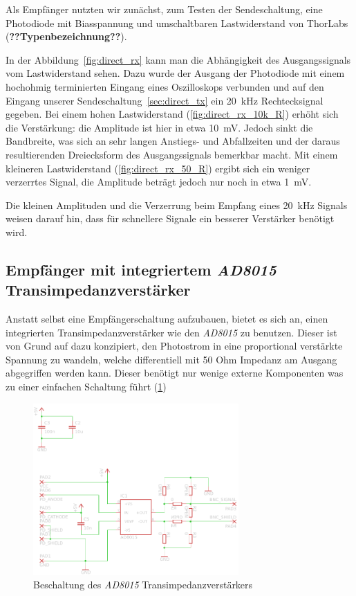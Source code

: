 \documentclass[12pt,a4paper]{article}
\begin{document}
Als Empfänger nutzten wir zunächst, zum Testen der Sendeschaltung, eine Photodiode mit Biasspannung und umschaltbaren Lastwiderstand von ThorLabs (\textbf{??Typenbezeichnung??}).

In der Abbildung~\ref{fig:direct_rx} kann man die Abhängigkeit des Ausgangssignals vom Lastwiderstand sehen. Dazu wurde der Ausgang der Photodiode mit einem hochohmig terminierten Eingang eines Oszilloskops verbunden und auf den Eingang unserer Sendeschaltung~\ref{sec:direct_tx} ein \SI{20}{\kilo\hertz} Rechtecksignal gegeben. Bei einem hohen Lastwiderstand (\ref{fig:direct_rx_10k_R}) erhöht sich die Verstärkung: die Amplitude ist hier in etwa \SI{10}{\milli\volt}. Jedoch sinkt die Bandbreite, was sich an sehr langen Anstiegs- und Abfallzeiten und der daraus resultierenden Dreiecksform des Ausgangssignals bemerkbar macht. Mit einem kleineren Lastwiderstand (\ref{fig:direct_rx_50_R}) ergibt sich ein weniger verzerrtes Signal, die Amplitude beträgt jedoch nur noch in etwa \SI{1}{\milli\volt}.

Die kleinen Amplituden und die Verzerrung beim Empfang eines \SI{20}{\kilo\hertz} Signals weisen darauf hin, dass für schnellere Signale ein besserer Verstärker benötigt wird.

\subsection{Empfänger mit integriertem \textit{AD8015} Transimpedanzverstärker}
Anstatt selbst eine Empfängerschaltung aufzubauen, bietet es sich an, einen integrierten Transimpedanzverstärker wie den \textit{AD8015} zu benutzen. Dieser ist von Grund auf dazu konzipiert, den Photostrom in eine proportional verstärkte Spannung zu wandeln, welche differentiell mit 50 Ohm Impedanz am Ausgang abgegriffen werden kann. Dieser benötigt nur wenige externe Komponenten was zu einer einfachen Schaltung führt (\ref{fig:receiver_sch})


\begin{figure}[h]
  \centering
    \includegraphics[width=0.7\textwidth]{img/receiver.pdf}
  \caption{Beschaltung des \textit{AD8015} Transimpedanzverstärkers}
  \label{fig:receiver_sch}
\end{figure}
\end{document}
